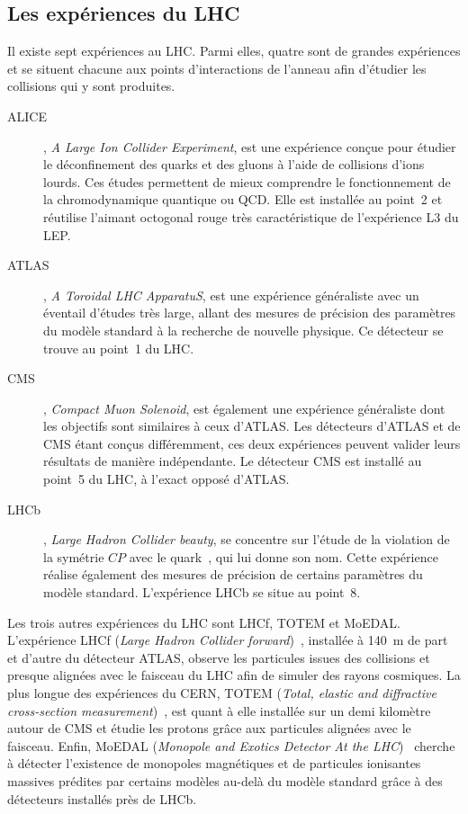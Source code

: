 \subsection{Les expériences du LHC}\label{chapter-LHC-section-LHC-subsec-experiments}
Il existe sept expériences au LHC.
Parmi elles, quatre sont de \og grandes expériences \fg{} et se situent chacune aux points d'interactions de l'anneau afin d'étudier les collisions qui y sont produites.
\begin{description}
\item[ALICE]\cite{alice_paper}, \emph{A Large Ion Collider Experiment}, est une expérience conçue pour étudier le déconfinement des quarks et des gluons à l'aide de collisions d'ions lourds. Ces études permettent de mieux comprendre le fonctionnement de la chromodynamique quantique ou QCD. Elle est installée au point~2 et réutilise l'aimant octogonal rouge très caractéristique de l'expérience L3 du LEP.
\item[ATLAS]\cite{atlas_paper}, \emph{A Toroidal LHC ApparatuS}, est une expérience généraliste avec un éventail d'études très large, allant des mesures de précision des paramètres du modèle standard à la recherche de nouvelle physique. Ce détecteur se trouve au point~1 du LHC.
\item[CMS]\cite{cms_paper}, \emph{Compact Muon Solenoid}, est également une expérience généraliste dont les objectifs sont similaires à ceux d'ATLAS. Les détecteurs d'ATLAS et de CMS étant conçus différemment, ces deux expériences peuvent valider leurs résultats de manière indépendante. Le détecteur CMS est installé au point~5 du LHC, à l'exact opposé d'ATLAS.
\item[LHCb]\cite{lhcb_paper}, \emph{Large Hadron Collider beauty}, se concentre sur l'étude de la violation de la symétrie $CP$ avec le quark~\quarkb, qui lui donne son nom. Cette expérience réalise également des mesures de précision de certains paramètres du modèle standard. L'expérience LHCb se situe au point~8.
\end{description}
\par Les trois autres expériences du LHC sont LHCf, TOTEM et MoEDAL.
L'expérience LHCf (\emph{Large Hadron Collider forward})~\cite{lhcf_paper}, installée à \SI{140}{\meter} de part et d'autre du détecteur ATLAS, observe les particules issues des collisions et presque alignées avec le faisceau du LHC afin de simuler des rayons cosmiques.
La plus \og longue \fg{} des expériences du CERN, TOTEM (\emph{Total, elastic and diffractive cross-section measurement})~\cite{totem_paper}, est quant à elle installée sur un demi kilomètre autour de CMS et étudie les protons grâce aux particules alignées avec le faisceau.
Enfin, MoEDAL (\emph{Monopole and Exotics Detector At the LHC})~\cite{moedal_paper} cherche à détecter l'existence de monopoles magnétiques et de particules ionisantes massives prédites par certains modèles au-delà du modèle standard grâce à des détecteurs installés près de LHCb.
